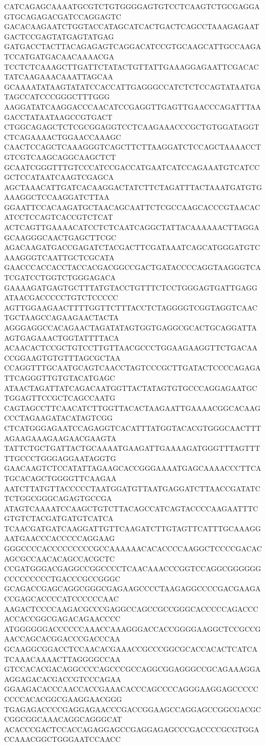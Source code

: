 CATCAGAGCAAAATGCGTCTGTGGGGAGTGTCCTCAAGTCTGCGAGGAGTGCAGAGACGATCCAGGAGTC
GACACAAGAATCTGGTACCATAGCATCACTGACTCAGCCTAAAGAGAATGACTCCGAGTATGAGTATGAG
GATGACCTACTTACAGAGAGTCAGGACATCCGTGCAAGCATTGCCAAGATCCATGATGACAACAAAACGA
TCCTCTCAAAGCTTGATTCTATACTGTTATTGAAAGGAGAATTCGACACTATCAAGAAACAAATTAGCAA
GCAAAATATAAGTATATCCACCATTGAGGGCCATCTCTCCAGTATAATGATAGCCATCCCGGGCTTTGGG
AAGGATATCAAGGACCCAACATCCGAGGTTGAGTTGAACCCAGATTTAAGACCTATAATAAGCCGTGACT
CTGGCAGAGCTCTCGCGGAGGTCCTCAAGAAACCCGCTGTGGATAGGTCTCAGAAAACTGGAACCAAAGC
CAACTCCAGCTCAAAGGGTCAGCTTCTTAAGGATCTCCAGCTAAAACCTGTCGTCAAGCAGGCAAGCTCT
GCAATCGGGTTTGTCCCATCCGACCATGAATCATCCAGAAATGTCATCCGCTCCATAATCAAGTCGAGCA
AGCTAAACATTGATCACAAGGACTATCTTCTAGATTTACTAAATGATGTGAAAGGCTCCAAGGATCTTAA
GGAATTCCACAAGATGCTAACAGCAATTCTCGCCAAGCACCCGTAACACATCCTCCAGTCACCGTCTCAT
ACTCAGTTGAAAACATCCTCTCAATCAGGCTATTACAAAAAACTTAGGAGCAAGGGCAACTGAGCTTCGC
AGACAAGATGACCGAGATCTACGACTTCGATAAATCAGCATGGGATGTCAAAGGGTCAATTGCTCGCATA
GAACCCACCACCTACCACGACGGCCGACTGATACCCCAGGTAAGGGTCATCGATCCTGGTCTGGGAGACA
GAAAAGATGAGTGCTTTATGTACCTGTTTCTCCTGGGAGTGATTGAGGATAACGACCCCCTGTCTCCCCC
AGTTGGAAGAACTTTTGGTTCTTTACCTCTAGGGGTCGGTAGGTCAACTGCTAAGCCAGAAGAACTACTA
AGGGAGGCCACAGAACTAGATATAGTGGTGAGGCGCACTGCAGGATTAAGTGAGAAACTGGTATTTTACA
ACAACACTCCGCTGTCCTTGTTAACGCCCTGGAAGAAGGTTCTGACAACCGGAAGTGTGTTTAGCGCTAA
CCAGGTTTGCAATGCAGTCAACCTAGTCCCGCTTGATACTCCCCAGAGATTCAGGGTTGTGTACATGAGC
ATAACTAGATTATCAGACAATGGTTACTATAGTGTGCCCAGGAGAATGCTGGAGTTCCGCTCAGCCAATG
CAGTAGCCTTCAACATCTTGGTTACACTAAGAATTGAAAACGGCACAAGCCCTAGAAGATACATAGTCGG
CTCATGGGAGAATCCAGAGGTCACATTTATGGTACACGTGGGCAACTTTAGAAGAAAGAAGAACGAAGTA
TATTCTGCTGATTACTGCAAAATGAAGATTGAAAAGATGGGTTTAGTTTTTGCCCTGGGAGGAATAGGTG
GAACAAGTCTCCATATTAGAAGCACCGGGAAAATGAGCAAAACCCTTCATGCACAGCTGGGGTTCAAGAA
AATCTTATGTTACCCCCTAATGGATGTTAATGAGGATCTTAACCGATATCTCTGGCGGGCAGAGTGCCGA
ATAGTCAAAATCCAAGCTGTCTTACAGCCATCAGTACCCCAAGAATTTCGTGTCTACGATGATGTCATCA
TCAACGATGATCAAGGATTGTTCAAGATCTTGTAGTTCATTTGCAAAGGAATGAACCCACCCCCAGGAAG
GGGCCCCACCCCCCCCCGCCAAAAAACACACCCCAAGGCTCCCCGACACAGCGCCAACACAGCCACGCTC
CCGATGGGACGAGGCCGGCCCCTCAACAAACCCGGTCCAGGCGGGGGGCCCCCCCCCTGACCCGCCGGGC
GCAGACCGAGCAGGCGGGCGAGAAGCCCCTAAGAGGCCCCGACGAAGACCGAGCACCCCATCCCCCCAAC
AAGACTCCCCAAGACGCCCGAGGCCAGCCGCCGGGCACCCCCAGACCCACCACCGGCGAGACAGAACCCC
ATGGGGGGACCCCCCAAACCAAAGGGACCACCGGGGAAGGCTCCGCCGAACCAGCACGGACCCGACCCAA
GCAAGGCGGACCTCCAACACGAAACCGCCCGGCGCACCACACTCATCATCAAACAAAACTTAGGGGCCAA
GTCCACACGACAGGCCCCAGCCCGCCAGGCGGAGGGCCGCAGAAAGGAAGGAGACACGACCGTCCCAGAA
GGAAGACACCCAACCACCGAAACACCCAGCCCCAGGGAAGGAGCCCCCCCCCACACGGCGAAGGAACGGG
TGAGAGACCCCGAGGAGAACCCGACCGGAAGCCAGGAGCCGGCGACGCCGGCGGCAAACAGGCAGGGCAT
ACACCCGACTCCACCAGAGGAGCCGAGGAGAGCCCGACCCCGCGTGGACCAAACGGCTGGGAATCCAACC
